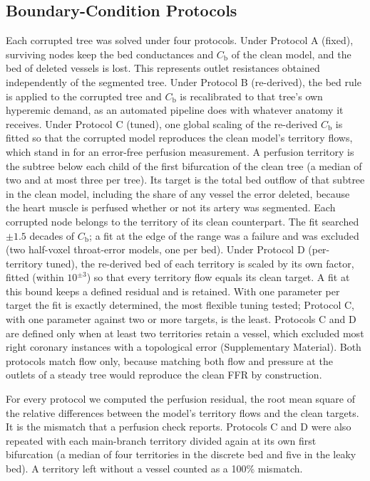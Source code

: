\documentclass[journal,twoside,web]{ieeecolor}
\begin{document}
\subsection{Boundary-Condition Protocols}
Each corrupted tree was solved under four protocols. Under Protocol A (fixed), surviving
nodes keep the bed conductances and $C_\mathrm{b}$ of the clean model, and the bed of deleted vessels is lost. This represents
outlet resistances obtained independently of the segmented tree. Under Protocol B
(re-derived), the bed rule is applied to the corrupted tree and $C_\mathrm{b}$ is recalibrated to that tree's own hyperemic
demand, as an automated pipeline does with whatever anatomy it receives. Under Protocol C (tuned), one global
scaling of the re-derived $C_\mathrm{b}$ is fitted so that the corrupted model reproduces the clean model's territory
flows, which stand in for an error-free perfusion measurement. A perfusion territory is the subtree below each child of
the first bifurcation of the clean tree (a median of two and at most three per tree). Its target is the total bed outflow of that subtree in the clean model,
including the share of any vessel the error deleted, because the heart muscle is perfused whether or not its artery
was segmented. Each corrupted node belongs to the territory of its clean counterpart. The fit searched $\pm 1.5$ decades
of $C_\mathrm{b}$; a fit at the edge of the range was a failure and was excluded (two half-voxel throat-error models, one per bed).
Under Protocol D (per-territory tuned), the re-derived bed of each territory is scaled by its own factor, fitted (within $10^{\pm 3}$) so that every territory flow equals its clean target. A fit at this bound keeps a defined residual and is retained. With one parameter per target the fit is exactly determined, the most flexible tuning tested; Protocol C, with one parameter against two or more targets, is the least. Protocols C and D are defined only when at least two territories retain a vessel, which excluded most right coronary
instances with a topological error (Supplementary Material). Both protocols match
flow only, because matching both flow and pressure at the outlets of a steady tree would reproduce the clean FFR by
construction.

For every protocol we computed the perfusion residual, the root mean square of the relative differences between the
model's territory flows and the clean targets. It is the mismatch that a perfusion check reports. Protocols C and D were also repeated with each main-branch territory divided again at its own first bifurcation (a median of four territories in the discrete bed and five in the leaky bed). A territory left without a vessel counted as a 100\% mismatch.
\end{document}
